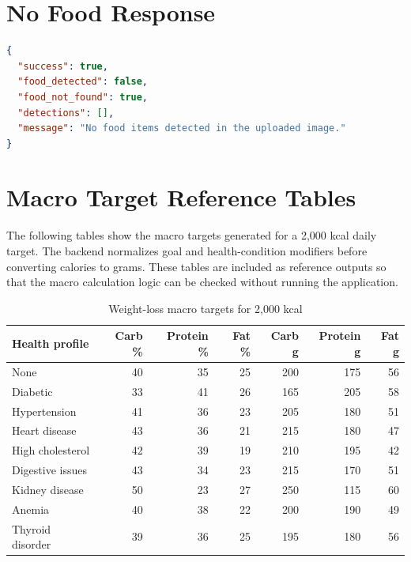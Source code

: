\section{No Food Response}

\begin{lstlisting}[language=json,caption={No-food response shape},label={lst:no-food-response}]
{
  "success": true,
  "food_detected": false,
  "food_not_found": true,
  "detections": [],
  "message": "No food items detected in the uploaded image."
}
\end{lstlisting}

\section{Macro Target Reference Tables}

The following tables show the macro targets generated for a 2,000 kcal daily target. The backend normalizes goal and health-condition modifiers before converting calories to grams. These tables are included as reference outputs so that the macro calculation logic can be checked without running the application.

\begin{table}[H]
\centering
\caption{Weight-loss macro targets for 2,000 kcal}
\begin{tabular}{lrrrrrr}
\toprule
Health profile & Carb \% & Protein \% & Fat \% & Carb g & Protein g & Fat g\\
\midrule
None & 40 & 35 & 25 & 200 & 175 & 56\\
Diabetic & 33 & 41 & 26 & 165 & 205 & 58\\
Hypertension & 41 & 36 & 23 & 205 & 180 & 51\\
Heart disease & 43 & 36 & 21 & 215 & 180 & 47\\
High cholesterol & 42 & 39 & 19 & 210 & 195 & 42\\
Digestive issues & 43 & 34 & 23 & 215 & 170 & 51\\
Kidney disease & 50 & 23 & 27 & 250 & 115 & 60\\
Anemia & 40 & 38 & 22 & 200 & 190 & 49\\
Thyroid disorder & 39 & 36 & 25 & 195 & 180 & 56\\
\bottomrule
\end{tabular}
\end{table}


